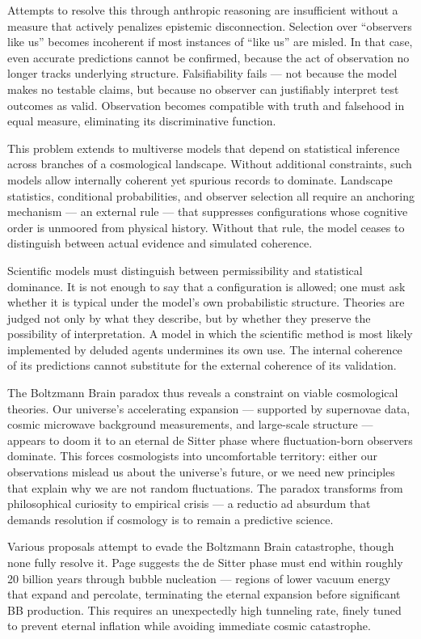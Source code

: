 Attempts to resolve this through anthropic reasoning are insufficient without a measure that actively penalizes epistemic disconnection. Selection over “observers like us” becomes incoherent if most instances of “like us” are misled. In that case, even accurate predictions cannot be confirmed, because the act of observation no longer tracks underlying structure. Falsifiability fails — not because the model makes no testable claims, but because no observer can justifiably interpret test outcomes as valid. Observation becomes compatible with truth and falsehood in equal measure, eliminating its discriminative function.

This problem extends to multiverse models that depend on statistical inference across branches of a cosmological landscape. Without additional constraints, such models allow internally coherent yet spurious records to dominate. Landscape statistics, conditional probabilities, and observer selection all require an anchoring mechanism — an external rule — that suppresses configurations whose cognitive order is unmoored from physical history. Without that rule, the model ceases to distinguish between actual evidence and simulated coherence.

Scientific models must distinguish between permissibility and statistical dominance. It is not enough to say that a configuration is allowed; one must ask whether it is typical under the model's own probabilistic structure. Theories are judged not only by what they describe, but by whether they preserve the possibility of interpretation. A model in which the scientific method is most likely implemented by deluded agents undermines its own use. The internal coherence of its predictions cannot substitute for the external coherence of its validation.

The Boltzmann Brain paradox thus reveals a constraint on viable cosmological theories. Our universe's accelerating expansion — supported by supernovae data, cosmic microwave background measurements, and large-scale structure — appears to doom it to an eternal de Sitter phase where fluctuation-born observers dominate. This forces cosmologists into uncomfortable territory: either our observations mislead us about the universe's future, or we need new principles that explain why we are not random fluctuations. The paradox transforms from philosophical curiosity to empirical crisis — a reductio ad absurdum that demands resolution if cosmology is to remain a predictive science.

Various proposals attempt to evade the Boltzmann Brain catastrophe, though none fully resolve it. Page suggests the de Sitter phase must end within roughly 20 billion years through bubble nucleation — regions of lower vacuum energy that expand and percolate, terminating the eternal expansion before significant BB production. This requires an unexpectedly high tunneling rate, finely tuned to prevent eternal inflation while avoiding immediate cosmic catastrophe.

